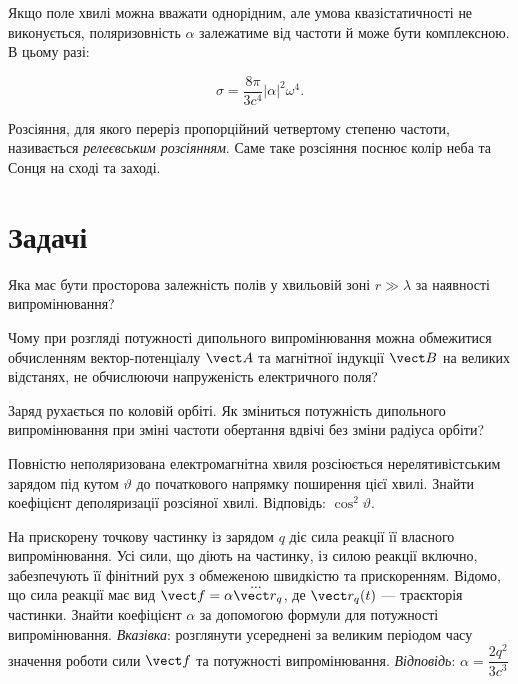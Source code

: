 Якщо поле хвилі можна вважати однорідним, але умова квазістатичності не виконується, поляризовність \( \alpha \)
залежатиме від частоти й може бути комплексною. В цьому разі:

\begin{equation*}
\sigma = \frac{8\pi}{3c^4} |\alpha|^2 \omega^4.
\end{equation*}

Розсіяння, для якого переріз пропорційний четвертому степеню частоти, називається \emph{релеєвським розсіянням}. Саме таке розсіяння поснює колір неба та Сонця на сході та заході.

\section*{Задачі}

\begin{problem}
Яка має бути просторова залежність полів у хвильовій зоні \( r \gg \lambda \) за наявності випромінювання?
\end{problem}

\begin{problem}
Чому при розгляді потужності дипольного випромінювання можна обмежитися обчисленням вектор-потенціалу \( \vect A \) та
магнітної індукції \( \vect B \) на великих відстанях, не обчислюючи напруженість електричного поля?
\end{problem}

\begin{problem}
Заряд рухається по коловій орбіті. Як зміниться потужність дипольного випромінювання при зміні частоти обертання вдвічі
без зміни радіуса орбіти?
\end{problem}

\begin{problem}
Повністю неполяризована електромагнітна хвиля розсіюється нерелятивістським зарядом під кутом \( \vartheta \) до
початкового напрямку поширення цієї хвилі. Знайти коефіцієнт деполяризації розсіяної хвилі. Відповідь: \(  \cos^2
\vartheta  \).
\end{problem}

\begin{problem}
На прискорену точкову частинку із зарядом \( q \) діє сила реакції її власного випромінювання. Усі сили, що діють на
частинку, із силою реакції включно, забезпечують її фінітний рух з обмеженою швидкістю та прискоренням. Відомо, що сила
реакції має вид \( \vect f = \alpha \dddot{\vect r}_q \), де \( \vect r_q(t) \) --- траєкторія частинки. Знайти
коефіцієнт \( \alpha \) за допомогою формули для потужності випромінювання.
%
\emph{Вказівка}: розглянути усереднені за великим періодом часу значення роботи сили \( \vect f \) та потужності
випромінювання.
%
\emph{Відповідь}: \( \alpha = \dfrac{2q^2}{3c^3} \)
\end{problem}

